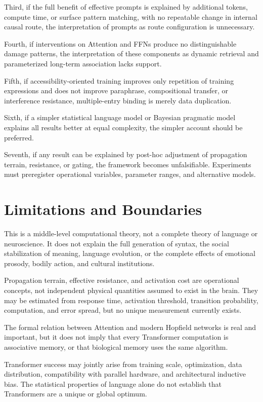\documentclass[11pt, a4paper]{article}
\begin{document}
Third, if the full benefit of effective prompts is explained by additional tokens, compute time, or surface pattern matching, with no repeatable change in internal causal route, the interpretation of prompts as route configuration is unnecessary.


Fourth, if interventions on Attention and FFNs produce no distinguishable damage patterns, the interpretation of these components as dynamic retrieval and parameterized long-term association lacks support.


Fifth, if accessibility-oriented training improves only repetition of training expressions and does not improve paraphrase, compositional transfer, or interference resistance, multiple-entry binding is merely data duplication.


Sixth, if a simpler statistical language model or Bayesian pragmatic model explains all results better at equal complexity, the simpler account should be preferred.


Seventh, if any result can be explained by post-hoc adjustment of propagation terrain, resistance, or gating, the framework becomes unfalsifiable. Experiments must preregister operational variables, parameter ranges, and alternative models.



\section{Limitations and Boundaries}


This is a middle-level computational theory, not a complete theory of language or neuroscience. It does not explain the full generation of syntax, the social stabilization of meaning, language evolution, or the complete effects of emotional prosody, bodily action, and cultural institutions.


Propagation terrain, effective resistance, and activation cost are operational concepts, not independent physical quantities assumed to exist in the brain. They may be estimated from response time, activation threshold, transition probability, computation, and error spread, but no unique measurement currently exists.


The formal relation between Attention and modern Hopfield networks is real and important, but it does not imply that every Transformer computation is associative memory, or that biological memory uses the same algorithm.


Transformer success may jointly arise from training scale, optimization, data distribution, compatibility with parallel hardware, and architectural inductive bias. The statistical properties of language alone do not establish that Transformers are a unique or global optimum.
\end{document}
